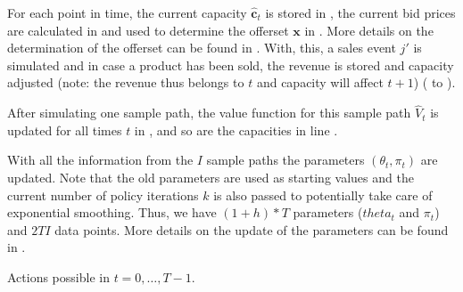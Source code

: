 For each point in time, the current capacity $\mathbf{\hat{c}}_t$ is stored in , the current bid prices are calculated in  and used to determine the offerset $\mathbf{x}$ in . More details on the determination of the offerset can be found in . With, this, a sales event $j'$ is simulated and in case a product has been sold, the revenue is stored and capacity adjusted (note: the revenue thus belongs to $t$ and capacity will affect $t+1$) ( to ).

After simulating one sample path, the value function for this sample path $\hat{V}_t$ is updated for all times $t$ in , and so are the capacities in line .

With all the information from the $I$ sample paths the parameters $\left(\theta_t, \pi_t \right)$ are updated. Note that the old parameters are used as starting values and the current number of policy iterations $k$ is also passed to potentially take care of exponential smoothing. Thus, we have $(1+h)*T$ parameters ($theta_t$ and $\pi_t$) and $2TI$ data points. More details on the update of the parameters can be found in .

Actions possible in $t = 0, \dots, T-1$.


